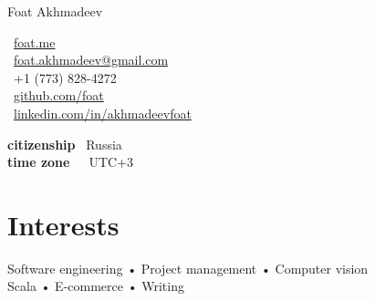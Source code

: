\documentclass[10pt, a4paper]{article}
\makeatletter
\def\myauthor{Foat Akhmadeev}
\def\myphone{+1 (773) 828-4272}
\def\myemail{foat.akhmadeev@gmail.com}
\def\mygithub{github.com/foat}
\def\mylinkedin{linkedin.com/in/akhmadeevfoat}
\def\myhomesite{foat.me}
\def\mycitizenship{Russia}
\def\mytimezone{UTC+3}
\makeatother
\begin{document}
{\LARGE \myauthor}\\[1cm]
\begin{minipage}[t]{2in}
\end{minipage}
\begin{minipage}[t]{2in}
\flushleft
\faHome \, \href{http://\myhomesite}{\myhomesite}\\
\faEnvelope \, \href{mailto:\myemail}{\myemail}\\
\faPhone \, \myphone\\
\faGithub \, \href{https://\mygithub}{\mygithub}\\
\faLinkedin \, \href{https://\mylinkedin}{\mylinkedin}\\
\end{minipage}
\begin{minipage}[t]{3in}
\flushleft
\textbf{citizenship} \, \mycitizenship\\
\textbf{time zone}\, \, \, \mytimezone\\
\end{minipage}

\section*{Interests}
Software engineering • Project management • Computer vision \\
Scala • E-commerce • Writing
\end{document}
